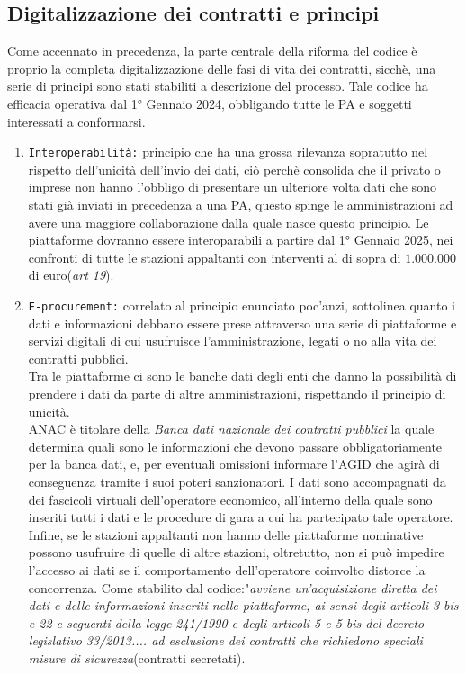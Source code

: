 \documentclass{article}
\begin{document}
\newpage\subsection{Digitalizzazione dei contratti e principi}
\begin{justify}
    Come accennato in precedenza, la parte centrale della riforma del codice è proprio la completa digitalizzazione delle fasi di vita dei contratti, sicchè, una serie di principi sono stati stabiliti a descrizione del processo.
    Tale codice ha efficacia operativa dal 1° Gennaio 2024, obbligando tutte le PA e soggetti interessati a conformarsi.\\
    \begin{enumerate}
        \item \texttt{Interoperabilità:} principio che ha una grossa rilevanza sopratutto nel rispetto dell'unicità dell'invio dei dati, ciò perchè consolida che il privato o imprese non hanno l'obbligo di presentare un ulteriore volta dati che sono stati già inviati in precedenza a una PA, questo spinge le amministrazioni ad avere una maggiore collaborazione dalla quale nasce questo principio. Le piattaforme dovranno essere interoparabili a partire dal 1° Gennaio 2025, nei confronti di tutte le stazioni appaltanti con interventi al di sopra di $1.000.000$ di euro(\textit{art 19}).
        \item \texttt{E-procurement:} correlato al principio enunciato poc'anzi, sottolinea quanto i dati e informazioni debbano essere prese attraverso una serie di piattaforme e servizi digitali di cui usufruisce l'amministrazione, legati o no alla vita dei contratti pubblici.\\ Tra le piattaforme ci sono le banche dati degli enti che danno la possibilità di prendere i dati da parte di altre amministrazioni, rispettando il principio di unicità.\\
        ANAC è titolare della \textit{Banca dati nazionale dei contratti pubblici} la quale determina quali sono le informazioni che devono passare obbligatoriamente per la banca dati, e, per eventuali omissioni informare l'AGID che agirà di conseguenza tramite i suoi poteri sanzionatori. I dati sono accompagnati da dei fascicoli virtuali dell'operatore economico, all'interno della quale sono inseriti tutti i dati e le procedure di gara a cui ha partecipato tale operatore. Infine, se le stazioni appaltanti non hanno delle piattaforme nominative possono usufruire di quelle di altre stazioni, oltretutto, non si può impedire l'accesso ai dati se il comportamento dell'operatore coinvolto distorce la concorrenza. Come stabilito dal codice:"\textit{avviene un'acquisizione diretta dei dati e delle informazioni inseriti nelle piattaforme, ai sensi degli articoli 3-bis e 22 e seguenti della legge 241/1990 e degli articoli 5 e 5-bis del decreto legislativo 33/2013.... ad esclusione dei contratti che richiedono speciali misure di sicurezza}(contratti secretati).\\

\end{enumerate}
\end{justify}
\end{document}
